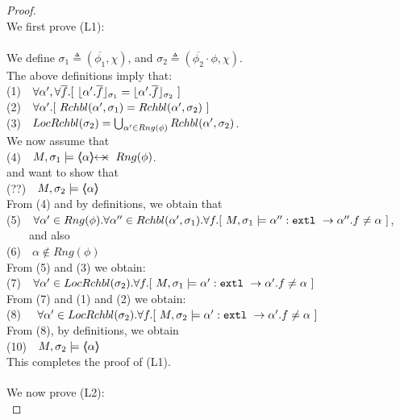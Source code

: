 \begin{proof}
$~$ \\
We first prove (L1): \\
~ \\
We define $\sigma_1 \triangleq (\overline {\phi_1},\chi)$, and  $\sigma_2 \triangleq (\overline {\phi_2}\cdot \phi,\chi) $.\\
The above definitions imply that: \\
\SP (1)\ \ $\forall \alpha',\forall \overline f.[\  \interpret {\sigma_1} {\alpha'.\overline f} =  \interpret {\sigma_2} {\alpha'.\overline f}\ ]$\\
\SP (2)\ \ $\forall \alpha'.[\  \Relevant {\alpha'} {\sigma_1} = \Relevant {\alpha'} {\sigma_2}\ ]$\\
\SP (3)\ \ $\LRelevantO {\sigma_2} = \bigcup_{\alpha'\in Rng(\phi)} \Relevant {\alpha'} {\sigma_2} $.\\
We now assume that\\
\SP (4)\ \ $M, \sigma_1 \models \protectedFrom \alpha {Rng(\phi)}$.\\
and want to show that\\
\SP (??)\ \ $M, \sigma_2 \models \inside \alpha$\\
From (4) and  by definitions, we obtain that\\
\SP (5)\ \ $\forall \alpha'\in Rng(\phi).\forall \alpha''\in \Relevant {\alpha'} {\sigma_1}.\forall f.[ \   M, \sigma_1 \models \alpha'':\prg{extl}\ \rightarrow \alpha''.f  \neq \alpha\ ]$, \ \ \ \ and also\\
\SP (6)\ \ $\alpha \notin Rng(\phi)$\\
From (5) and (3) we obtain:\\
\SP (7)\ \  $\forall \alpha' \in \LRelevantO {\sigma_2}.\forall f.[ \   M, \sigma_1 \models \alpha':\prg{extl}\ \rightarrow \alpha'.f  \neq \alpha\ ]$\\
From (7) and (1) and (2) we obtain:\\
\SP (8) \ \  $\forall \alpha' \in \LRelevantO {\sigma_2}.\forall f.[ \   M, \sigma_2 \models \alpha':\prg{extl}\ \rightarrow \alpha'.f  \neq \alpha\ ]$\\
From (8), by definitions, we obtain\\
 \SP (10)\ \ $M, \sigma_2 \models \inside \alpha$\\
 This completes the proof of (L1).
 \\
  $\strut ~ \ $\\
  We now prove (L2): \\

\end{proof}
